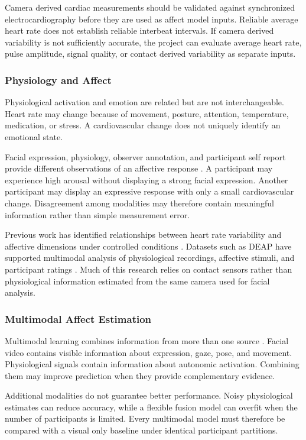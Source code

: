 \documentclass[12pt]{article}
\begin{document}
Camera derived cardiac measurements should be validated against synchronized electrocardiography before they are used as affect model inputs. Reliable average heart rate does not establish reliable interbeat intervals. If camera derived variability is not sufficiently accurate, the project can evaluate average heart rate, pulse amplitude, signal quality, or contact derived variability as separate inputs.

\subsubsection{Physiology and Affect}

Physiological activation and emotion are related but are not interchangeable. Heart rate may change because of movement, posture, attention, temperature, medication, or stress. A cardiovascular change does not uniquely identify an emotional state.

Facial expression, physiology, observer annotation, and participant self report provide different observations of an affective response \cite{scherer2005}. A participant may experience high arousal without displaying a strong facial expression. Another participant may display an expressive response with only a small cardiovascular change. Disagreement among modalities may therefore contain meaningful information rather than simple measurement error.

Previous work has identified relationships between heart rate variability and affective dimensions under controlled conditions \cite{nardelli2015}. Datasets such as DEAP have supported multimodal analysis of physiological recordings, affective stimuli, and participant ratings \cite{koelstra2012}. Much of this research relies on contact sensors rather than physiological information estimated from the same camera used for facial analysis.

\subsubsection{Multimodal Affect Estimation}

Multimodal learning combines information from more than one source \cite{baltrusaitis2019}. Facial video contains visible information about expression, gaze, pose, and movement. Physiological signals contain information about autonomic activation. Combining them may improve prediction when they provide complementary evidence.

Additional modalities do not guarantee better performance. Noisy physiological estimates can reduce accuracy, while a flexible fusion model can overfit when the number of participants is limited. Every multimodal model must therefore be compared with a visual only baseline under identical participant partitions.
\end{document}
